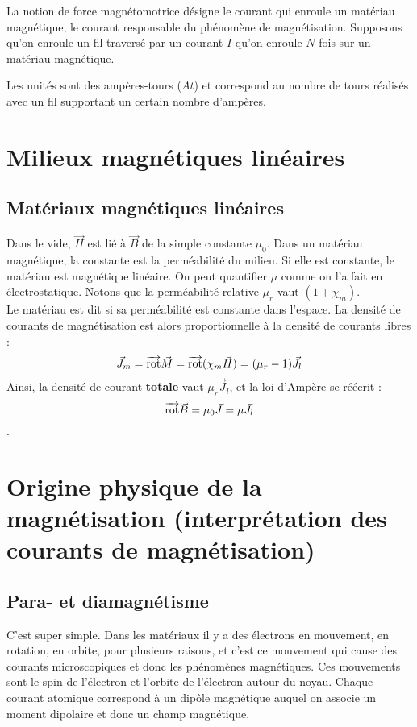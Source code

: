 \documentclass[12pt]{book}
\begin{document}
La notion de force magnétomotrice désigne le courant qui enroule un matériau magnétique, le courant responsable du phénomène de magnétisation. Supposons qu'on enroule un fil traversé par un courant $I$ qu'on enroule $N$ fois sur un matériau magnétique.

Les unités sont des ampères-tours ($At$) et correspond au nombre de tours réalisés avec un fil supportant un certain nombre d'ampères.

\section{Milieux magnétiques linéaires}
\subsection{Matériaux magnétiques linéaires}
Dans le vide, $\vec{H}$ est lié à $\vec{B}$ de la simple constante $\mu_0$. Dans un matériau magnétique, la constante est la perméabilité du milieu. Si elle est constante, le matériau est magnétique linéaire.  On peut quantifier $\mu$ comme on l'a fait en électrostatique. Notons que la perméabilité relative $\mu_r$ vaut $(1+\chi_m)$. \\

Le matériau est dit  si sa perméabilité est constante dans l'espace. La densité de courants de magnétisation est alors proportionnelle à la densité de courants libres : $$\vec{J}_m = \overrightarrow{\text{rot}} \vec{M} = \overrightarrow{\text{rot}} (\chi_m \vec{H}) = (\mu_r-1) \vec{J}_l$$
Ainsi, la densité de courant \textbf{totale} vaut $\mu_r \vec{J}_l$, et la loi d'Ampère se réécrit :
$$\overrightarrow{\text{rot}} \vec{B} = \mu_0 \vec{J} = \mu \vec{J}_l$$.

\section{Origine physique de la magnétisation (interprétation des courants de magnétisation)}
\subsection{Para- et diamagnétisme}
C'est super simple. Dans les matériaux il y a des électrons en mouvement, en rotation, en orbite, pour plusieurs raisons, et c'est ce mouvement qui cause des courants microscopiques et donc les phénomènes magnétiques. Ces mouvements sont le spin de l'électron et l'orbite de l'électron autour du noyau. Chaque courant atomique correspond à un dipôle magnétique auquel on associe un moment dipolaire et donc un champ magnétique. \\
\end{document}
